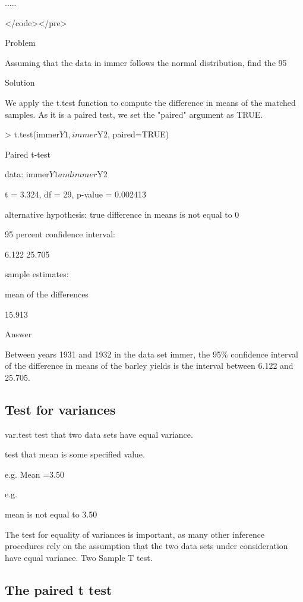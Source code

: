 \begin{framed}
\begin{framed}
\begin{framed}
   .....

</code></pre>

Problem

Assuming that the data in immer follows the normal distribution, find the 95%

Solution

We apply the t.test function to compute the difference in means of the matched samples. As it is a paired test, we set the "paired" argument as TRUE.

> t.test(immer$Y1, immer$Y2, paired=TRUE) 



          Paired t-test 



data:  immer$Y1 and immer$Y2 

t = 3.324, df = 29, p-value = 0.002413 

alternative hypothesis: true difference in means is not equal to 0 

95 percent confidence interval: 

 6.122 25.705 

sample estimates: 

mean of the differences 

                15.913

Answer

Between years 1931 and 1932 in the data set immer, the 95\% confidence interval of the difference in means of the barley yields is the interval between 6.122 and 25.705.

\subsection{Test for variances}


var.test test that two data sets have equal variance.


test that mean is some specified value. 


e.g. Mean =3.50

e.g. 

mean is not equal to 3.50 


The test for equality of variances is important, as many other inference procedures rely on the assumption that the two data sets under consideration have equal variance. Two Sample T test.

\subsection{The paired t test }


\end{framed}
\end{framed}
\end{framed}
